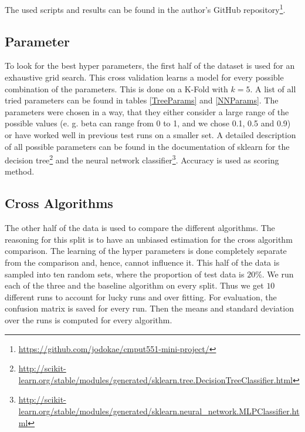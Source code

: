 \documentclass[a4paper,11pt]{article}
\begin{document}
The used scripts and results can be found in the author's GitHub repository\footnote{\url{https://github.com/jodokae/cmput551-mini-project/}}.



\subsection{Parameter}

To look for the best hyper parameters, the first half of the dataset is used for an exhaustive grid search. This cross validation learns a model for every possible combination of the parameters. This is done on a K-Fold with $k=5$. A list of all tried parameters can be found in tables \ref{TreeParams} and \ref{NNParams}. The parameters were chosen in a way, that they either consider a large range of the possible values (e. g. beta can range from 0 to 1, and we chose 0.1, 0.5 and 0.9) or have worked well in previous test runs on a smaller set.
A detailed description of all possible parameters can be found in the documentation of sklearn for the decision tree\footnote{\url{http://scikit-learn.org/stable/modules/generated/sklearn.tree.DecisionTreeClassifier.html}} and the neural network classifier\footnote{\url{http://scikit-learn.org/stable/modules/generated/sklearn.neural_network.MLPClassifier.html}}. 
Accuracy is used as scoring method. 



\subsection{Cross Algorithms}

The other half of the data is used to compare the different algorithms. 
The reasoning for this split is to have an unbiased estimation for the cross algorithm comparison. The learning of the hyper parameters is done completely separate from the comparison and, hence, cannot influence it.
This half of the data is sampled into ten random sets, where the proportion of test data is $20\%$. We run each of the three and the baseline algorithm on every split. Thus we get $10$ different runs to account for lucky runs and over fitting.
For evaluation, the confusion matrix is saved for every run. Then the means and standard deviation over the runs is computed for every algorithm.

\end{document}
